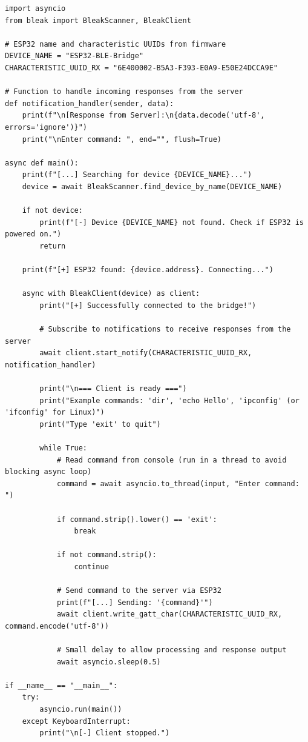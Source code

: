 \begin{lstlisting}[caption={Клиентская часть на ПК 1}, label={lst:lab4_client}]
import asyncio
from bleak import BleakScanner, BleakClient

# ESP32 name and characteristic UUIDs from firmware
DEVICE_NAME = "ESP32-BLE-Bridge"
CHARACTERISTIC_UUID_RX = "6E400002-B5A3-F393-E0A9-E50E24DCCA9E"

# Function to handle incoming responses from the server
def notification_handler(sender, data):
    print(f"\n[Response from Server]:\n{data.decode('utf-8', errors='ignore')}")
    print("\nEnter command: ", end="", flush=True)

async def main():
    print(f"[...] Searching for device {DEVICE_NAME}...")
    device = await BleakScanner.find_device_by_name(DEVICE_NAME)

    if not device:
        print(f"[-] Device {DEVICE_NAME} not found. Check if ESP32 is powered on.")
        return

    print(f"[+] ESP32 found: {device.address}. Connecting...")

    async with BleakClient(device) as client:
        print("[+] Successfully connected to the bridge!")

        # Subscribe to notifications to receive responses from the server
        await client.start_notify(CHARACTERISTIC_UUID_RX, notification_handler)

        print("\n=== Client is ready ===")
        print("Example commands: 'dir', 'echo Hello', 'ipconfig' (or 'ifconfig' for Linux)")
        print("Type 'exit' to quit")

        while True:
            # Read command from console (run in a thread to avoid blocking async loop)
            command = await asyncio.to_thread(input, "Enter command: ")

            if command.strip().lower() == 'exit':
                break

            if not command.strip():
                continue

            # Send command to the server via ESP32
            print(f"[...] Sending: '{command}'")
            await client.write_gatt_char(CHARACTERISTIC_UUID_RX, command.encode('utf-8'))

            # Small delay to allow processing and response output
            await asyncio.sleep(0.5)

if __name__ == "__main__":
    try:
        asyncio.run(main())
    except KeyboardInterrupt:
        print("\n[-] Client stopped.")
\end{lstlisting}

